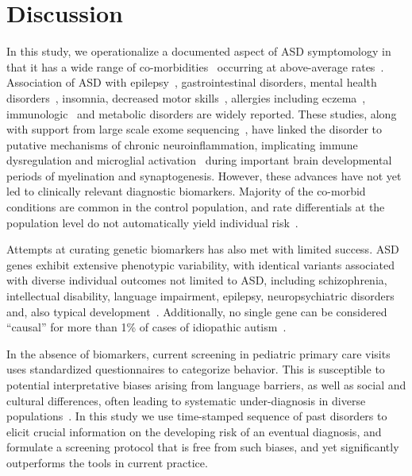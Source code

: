 \documentclass[3p,super,numbers,sort&compress,preprint,10pt]{elsarticle}
\begin{document}
\section*{Discussion}
In this study, we operationalize a documented aspect of ASD symptomology in  that it has   a wide range  of co-morbidities~\cite{pmid22511918,pmid30733689,pmid25681541} occurring at above-average  rates~\cite{hyman2020identification}. Association of ASD  with epilepsy~\cite{pmid23935565}, gastrointestinal disorders\cite{pmid30646068,pmid21651783,pmid30823414,pmid21282636,pmid29028817,pmid30109601}, mental health disorders~\cite{pmid24729779}, insomnia, decreased motor skills~\cite{pmid30337860}, allergies including eczema~\cite{pmid30646068,pmid21651783,pmid30823414,pmid21282636,pmid29028817,pmid30109601}, immunologic~\cite{pmid30971960,pmid30941018,pmid29691724,pmid29307081,pmid27351598,pmid26793298,pmid30095240,pmid25681541} and metabolic\cite{pmid30178105,pmid27957319,pmid29028817} disorders are  widely reported. These studies, along with support from large scale exome sequencing~\cite{Satterstrom484113,pmid25038753}, have linked the disorder to putative mechanisms of  chronic neuroinflammation,  implicating immune dysregulation and microglial activation~\cite{pmid15546155,pmid21595886,pmid21629840,pmid26793298,pmid30483058,pmid29691724} during important brain developmental periods  of  myelination and synaptogenesis. However, these advances have not yet led  to   clinically relevant diagnostic biomarkers.  Majority of the co-morbid conditions are common in the control population, and  rate differentials at the population level do not automatically yield individual risk~\cite{Pearce2000}.

Attempts at curating genetic biomarkers has also met with limited success. ASD genes exhibit extensive phenotypic variability, with identical variants associated with diverse individual outcomes not limited to ASD, including schizophrenia, intellectual disability, language impairment, epilepsy, neuropsychiatric disorders and, also typical development~\cite{pmid23537858}. Additionally, no single
gene can be considered ``causal'' for more than 1\% of cases of idiopathic autism~\cite{pmid23637569}.

In the absence of biomarkers,  current screening in pediatric primary care visits uses standardized  questionnaires to categorize behavior. This is  susceptible to potential interpretative biases arising from language barriers, as well as social and cultural differences, often leading to systematic under-diagnosis in diverse populations~\cite{hyman2020identification}. In this study we use  time-stamped sequence of past  disorders  to elicit crucial information on the developing risk of an eventual  diagnosis, and formulate a screening protocol that is free from such biases, and yet significantly outperforms the tools in current practice.
\end{document}
